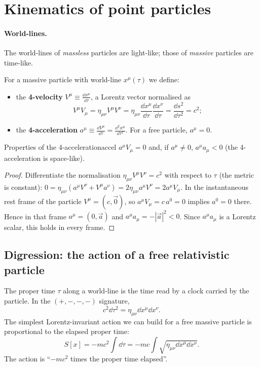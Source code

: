 \section{Kinematics of point particles}

\paragraph{World-lines.} The world-lines of \emph{massless} particles are light-like; those of \emph{massive} particles are time-like.

For a massive particle with world-line $x^\mu(\tau)$ we define:
\begin{itemize}
  \item the \textbf{4-velocity} $\displaystyle V^\mu\equiv\frac{\dd x^\mu}{\dd\tau}$, a Lorentz vector normalised as
  \begin{equation}
    V^\mu V_\mu=\eta_{\mu\nu}V^\mu V^\nu=\eta_{\mu\nu}\frac{\dd x^\mu}{\dd\tau}\frac{\dd x^\nu}{\dd\tau}=\frac{\dd s^2}{\dd\tau^2}=c^2 ;
  \end{equation}
  \item the \textbf{4-acceleration} $\displaystyle a^\mu\equiv\frac{\dd V^\mu}{\dd\tau}=\frac{\dd^2x^\mu}{\dd\tau^2}$. For a free particle, $a^\mu=0$.
\end{itemize}

\begin{proposition}{Properties of the 4-acceleration}{accel}
$a^\mu V_\mu=0$ and, if $a^\mu\neq0$, $a^\mu a_\mu<0$ (the 4-acceleration is space-like).
\end{proposition}
\begin{proof}
Differentiate the normalisation $\eta_{\mu\nu}V^\mu V^\nu=c^2$ with respect to $\tau$ (the metric is constant):
$0=\eta_{\mu\nu}(a^\mu V^\nu+V^\mu a^\nu)=2\eta_{\mu\nu}a^\mu V^\nu=2a^\mu V_\mu$.
In the instantaneous rest frame of the particle $V^\mu=(c,\vec 0)$, so $a^\mu V_\mu=c\,a^0=0$ implies $a^0=0$ there. Hence in that frame $a^\mu=(0,\vec a)$ and $a^\mu a_\mu=-|\vec a|^2<0$. Since $a^\mu a_\mu$ is a Lorentz scalar, this holds in every frame.
\end{proof}

\subsection{Digression: the action of a free relativistic particle}

The proper time $\tau$ along a world-line is the time read by a clock carried by the particle. In the $(+,-,-,-)$ signature,
\begin{equation}
  c^2\dd\tau^2=\eta_{\mu\nu}\dd x^\mu\dd x^\nu .
\end{equation}
The simplest Lorentz-invariant action we can build for a free massive particle is proportional to the elapsed proper time:
\begin{equation}
  S[x]=-mc^2\int\dd\tau=-mc\int\sqrt{\eta_{\mu\nu}\dd x^\mu\dd x^\nu} .
\end{equation}
The action is ``$-mc^2$ times the proper time elapsed''.


